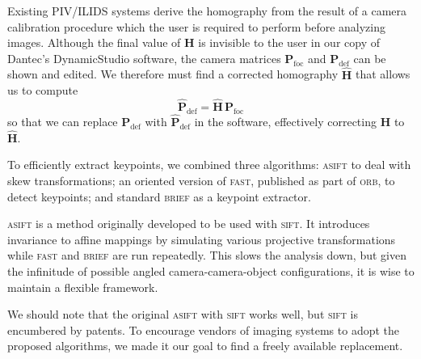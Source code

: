 \documentclass[11.5pt]{book}
\begin{document}
Existing PIV/ILIDS systems derive the homography from the result of a camera
calibration procedure which the user is required to perform before analyzing
images.
Although the final value of $\mathbf{H}$ is invisible to the user in our copy of
Dantec's DynamicStudio software, the camera matrices $\mathbf{P}_\text{foc}$ and
$\mathbf{P}_\text{def}$ can be shown and edited. We therefore must find a
corrected homography $\mathbf{\hat{H}}$ that allows us to compute
\begin{equation}
    \mathbf{\hat{P}}_\text{def} = \mathbf{\hat{H}} \, \mathbf{P}_\text{foc}
    \label{corrected-homography-use}
\end{equation}
so that we can replace $\mathbf{P}_\text{def}$ with $\mathbf{\hat{P}}_\text{def}$ in
the software, effectively correcting $\mathbf{H}$ to $\mathbf{\hat{H}}$.

To efficiently extract keypoints, we combined three algorithms:
\textsc{asift} \cite{Morel09} to deal with skew transformations; an oriented version of
\textsc{fast}, published as part of \textsc{orb}, to detect keypoints; and
standard \textsc{brief} as a keypoint extractor.

\textsc{asift} is a method originally developed to be used with \textsc{sift}.
It introduces invariance to affine mappings by simulating various
projective transformations while \textsc{fast} and \textsc{brief} are run repeatedly.
This slows the analysis down, but given the infinitude of
possible angled camera-camera-object configurations, it is wise to maintain a
flexible framework.

We should note that the original \textsc{asift} with
\textsc{sift} works well, but \textsc{sift} is encumbered by patents. To
encourage vendors of imaging systems to adopt the proposed algorithms, we made
it our goal to find a freely available replacement.
\end{document}
